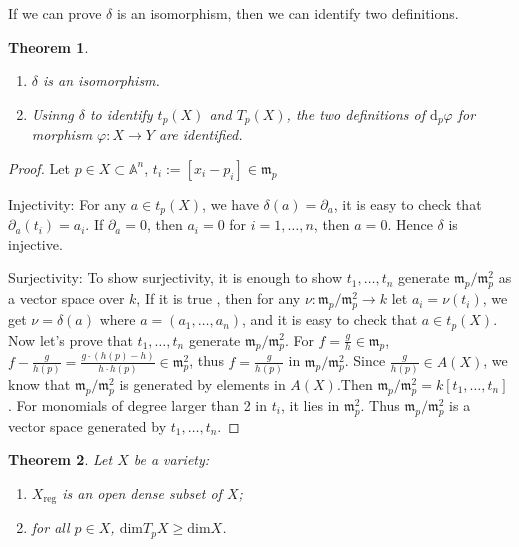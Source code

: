 \documentclass{amsart}
\theoremstyle{plain}
\newtheorem{theorem}{Theorem}
\theoremstyle{definition}
\theoremstyle{remark}
\numberwithin{equation}{section}
\begin{document}
If we can prove $ \delta $ is an isomorphism, then we can identify two definitions.
\begin{theorem}
	\begin{enumerate}
			\item $ \delta $ is an isomorphism. 
			\item Usinng $ \delta $ to identify $ t_p(X) $ and $ T_p(X) $, the two definitions of $ \mathrm{d}_p\varphi $ for morphism $ \varphi :X\to Y $ are identified.
	\end{enumerate}
\end{theorem} 
\begin{proof}
	Let $ p\in X\subset\mathbb{A}^n $, $ t_i:=[x_i-p_i]\in \mathfrak{m}_p $
	
	Injectivity: For any $ a\in t_p(X) $, we have $ \delta (a)=\partial_a $, it is easy to check that $ \partial_a(t_i)=a_i $. If $ \partial_a=0 $, then $ a_i=0 $ for $ i=1,\dots,n $, then $ a=0 $. Hence $ \delta $ is injective.
	
	Surjectivity: To show surjectivity, it is enough to show $ t_1,\dots,t_n $ generate $ \mathfrak{m}_p/\mathfrak{m}_p^2 $ as a vector space over $ k $, If  it is true , then for any $ \nu:\mathfrak{m}_p/\mathfrak{m}_p^2\to k $ let $ a_i=\nu(t_i) $, we get $ \nu=\delta(a) $ where $ a=(a_1,\dots,a_n) $, and it is easy to check that $ a\in t_p(X) $. Now let's prove that $ t_1,\dots,t_n $ generate $ \mathfrak{m}_p/\mathfrak{m}_p^2 $. For $ f=\frac{g}{h}\in \mathfrak{m}_p $, $ f-\frac{g}{h(p)}=\frac{g\cdot(h(p)-h)}{h\cdot h(p)}\in \mathfrak{m}_p^2 $, thus $ f=\frac{g}{h(p)} $ in $ \mathfrak{m}_p/\mathfrak{m}_p^2 $. Since $ \frac{g}{h(p)}\in A(X) $, we know that $ \mathfrak{m}_p/\mathfrak{m}_p^2 $ is generated by elements in $ A(X) $.Then $ \mathfrak{m}_p/\mathfrak{m}_p^2 =k[t_1,\dots,t_n]$. For monomials of degree larger than 2 in $ t_i $, it lies in $ \mathfrak{m}_p^2 $.  Thus $ \mathfrak{m}_p/\mathfrak{m}_p^2 $ is a vector space generated by $ t_1,\dots,t_n $.
\end{proof}
\begin{theorem}
	Let $ X $ be a variety:
	\begin{enumerate}
		\item $ X_{\mathrm{reg}} $ is an open dense subset of $ X $;
		\item for all $ p\in X $, $ \mathrm{dim}T_pX\geq \mathrm{dim}X $.
	\end{enumerate}
\end{theorem}
\end{document}
